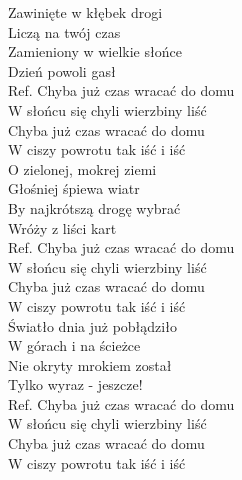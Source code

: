 
Zawinięte w kłębek drogi \tab{} \\
Liczą na twój czas \tab{}\\
Zamieniony w wielkie słońce \tab{}\\
Dzień powoli gasł \tab{}\\
\hops
Ref. Chyba już czas wracać do domu \\
 W słońcu się chyli wierzbiny liść \\
 Chyba już czas wracać do domu \\
 W ciszy powrotu tak iść i iść \\
\hops
O zielonej, mokrej ziemi \\
Głośniej śpiewa wiatr \\
By najkrótszą drogę wybrać \\
Wróży z liści kart \\
\hops
Ref. Chyba już czas wracać do domu \\
 W słońcu się chyli wierzbiny liść \\
 Chyba już czas wracać do domu \\
 W ciszy powrotu tak iść i iść \\
\hops
Światło dnia już pobłądziło \\
W górach i na ścieżce \\
Nie okryty mrokiem został \\
Tylko wyraz - jeszcze! \\
\hops
Ref. Chyba już czas wracać do domu \\
 W słońcu się chyli wierzbiny liść \\
 Chyba już czas wracać do domu \\
 W ciszy powrotu tak iść i iść